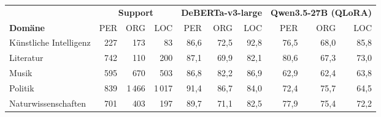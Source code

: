 \begin{tabular}{lrrrrrrrrr}
    \toprule
    & \multicolumn{3}{c}{\textbf{Support}} & \multicolumn{3}{c}{\textbf{DeBERTa-v3-large}} &
      \multicolumn{3}{c}{\textbf{Qwen3.5-27B (QLoRA)}} \\
    \cmidrule(lr){2-4}\cmidrule(lr){5-7}\cmidrule(lr){8-10}
    \textbf{Dom\"ane} & PER & ORG & LOC & PER & ORG & LOC & PER & ORG & LOC \\
    \midrule
    K\"unstliche Intelligenz & 227 & 173 & 83 & 86,6 & 72,5 & 92,8 & 76,5 & 68,0 & 85,8 \\
    Literatur & 742 & 110 & 200 & 87,1 & 69,9 & 82,1 & 80,6 & 67,3 & 73,0 \\
    Musik & 595 & 670 & 503 & 86,8 & 82,2 & 86,9 & 62,9 & 62,4 & 63,8 \\
    Politik & 839 & 1\,466 & 1\,017 & 91,4 & 86,7 & 84,0 & 72,4 & 75,7 & 64,5 \\
    Naturwissenschaften & 701 & 403 & 197 & 89,7 & 71,1 & 82,5 & 77,9 & 75,4 & 72,2 \\
    \bottomrule
\end{tabular}
